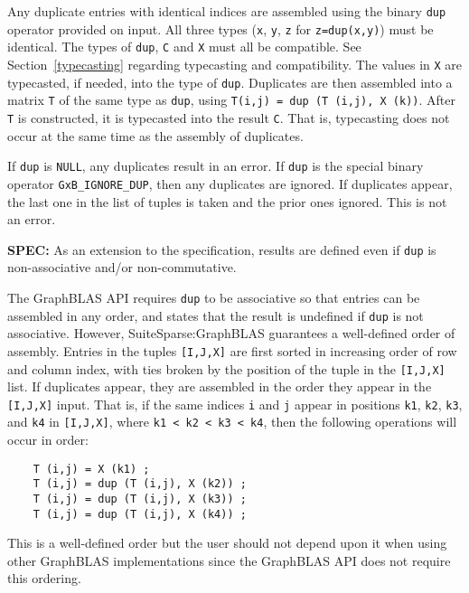 \documentclass[12pt]{article}
\begin{document}
Any duplicate entries with identical indices are assembled using the binary
\verb'dup' operator provided on input.  All three types (\verb'x', \verb'y',
\verb'z' for \verb'z=dup(x,y)') must be identical.  The types of \verb'dup',
\verb'C' and \verb'X' must all be compatible.  See Section~\ref{typecasting}
regarding typecasting and compatibility.  The values in \verb'X' are
typecasted, if needed, into the type of \verb'dup'.  Duplicates are then
assembled into a matrix \verb'T' of the same type as \verb'dup', using
\verb'T(i,j) = dup (T (i,j), X (k))'.  After \verb'T' is constructed, it is
typecasted into the result \verb'C'.  That is, typecasting does not occur at
the same time as the assembly of duplicates.

If \verb'dup' is \verb'NULL', any duplicates result in an error.
If \verb'dup' is the special binary operator \verb'GxB_IGNORE_DUP', then
any duplicates are ignored.  If duplicates appear, the last one in the
list of tuples is taken and the prior ones ignored.  This is not an error.

\begin{alert}
{\bf SPEC:} As an extension to the specification,
results are defined even if \verb'dup'
is non-associative and/or non-commutative.
\end{alert}

The GraphBLAS API requires \verb'dup' to be associative so
that entries can be assembled in any order, and states that the result is
undefined if \verb'dup' is not associative.  However, SuiteSparse:GraphBLAS
guarantees a well-defined order of assembly.  Entries in the tuples
\verb'[I,J,X]' are first sorted in increasing order of row and column index,
with ties broken by the position of the tuple in the \verb'[I,J,X]' list.  If
duplicates appear, they are assembled in the order they appear in the
\verb'[I,J,X]' input.  That is, if the same indices \verb'i' and \verb'j'
appear in positions \verb'k1', \verb'k2', \verb'k3', and \verb'k4' in
\verb'[I,J,X]', where \verb'k1 < k2 < k3 < k4', then the following operations
will occur in order:

    {\footnotesize
    \begin{verbatim}
    T (i,j) = X (k1) ;
    T (i,j) = dup (T (i,j), X (k2)) ;
    T (i,j) = dup (T (i,j), X (k3)) ;
    T (i,j) = dup (T (i,j), X (k4)) ; \end{verbatim}}

This is a well-defined order but the user should not depend upon it when using
other GraphBLAS implementations since the GraphBLAS API does not
require this ordering.
\end{document}
